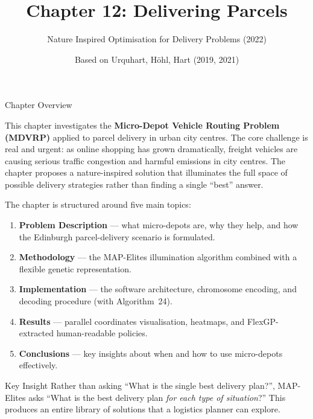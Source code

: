 \documentclass[aspectratio=169,10pt]{beamer}
\title[Ch.12: Delivering Parcels]{Chapter 12: Delivering Parcels}
\subtitle{Nature Inspired Optimisation for Delivery Problems (2022)}
\author{Based on Urquhart, H\"{o}hl, Hart (2019, 2021)}
\date{}
\begin{document}
\begin{frame}
  \titlepage
\end{frame}

\begin{frame}[allowframebreaks]{Chapter Overview}

This chapter investigates the \textbf{Micro-Depot Vehicle Routing Problem (MDVRP)}
applied to parcel delivery in urban city centres.
The core challenge is real and urgent: as online shopping has grown dramatically,
freight vehicles are causing serious traffic congestion and harmful emissions
in city centres.
The chapter proposes a nature-inspired solution that illuminates the full space
of possible delivery strategies rather than finding a single ``best'' answer.

\medskip

The chapter is structured around five main topics:

\begin{enumerate}
  \item \textbf{Problem Description} --- what micro-depots are, why they help,
        and how the Edinburgh parcel-delivery scenario is formulated.
  \item \textbf{Methodology} --- the MAP-Elites illumination algorithm
        combined with a flexible genetic representation.
  \item \textbf{Implementation} --- the software architecture, chromosome encoding,
        and decoding procedure (with Algorithm~24).
  \item \textbf{Results} --- parallel coordinates visualisation, heatmaps,
        and FlexGP-extracted human-readable policies.
  \item \textbf{Conclusions} --- key insights about when and how to use
        micro-depots effectively.
\end{enumerate}

\medskip

\begin{alertblock}{Key Insight}
  Rather than asking ``What is the single best delivery plan?'',
  MAP-Elites asks ``What is the best delivery plan \emph{for each type of situation}?''
  This produces an entire library of solutions that a logistics planner
  can explore.
\end{alertblock}

\end{frame}

\end{document}
